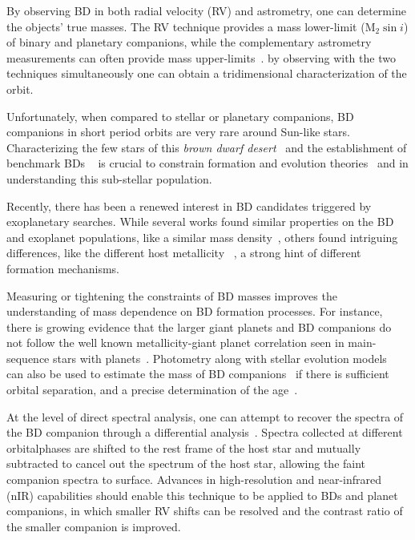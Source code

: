 \documentclass[fleqn,usenatbib]{mnras}
\newcommand*\bl{\color{blue}}
\begin{document}
    {\bl By observing BD in both radial velocity (RV) and astrometry, one can determine the objects' true masses}. The RV technique provides a mass lower-limit (\(\textrm{M}_{2}\sin{i}\)) of binary and planetary companions, while the complementary astrometry measurements can often provide mass upper-limits~\citep[e.g.][]{sahlmann_search_2011}. {\bl by observing with the two techniques simultaneously one can obtain a tridimensional characterization of the orbit.} 
    
    {\bl Unfortunately, when compared to stellar or planetary companions, BD companions in short period orbits are very rare around Sun-like stars. Characterizing the few stars of this \emph{brown dwarf desert}~\citep{halbwachs_exploring_2000,zucker_analysis_2001,sahlmann_search_2011} and the establishment of benchmark BDs ~\citep[e.g.][]{crepp_trends_2016} is crucial to constrain formation and evolution theories~\citep{whitworth_formation_2007} and in understanding this sub-stellar population.}
    
    Recently, there has been a renewed interest in BD candidates triggered by exoplanetary searches. {\bl While several works found similar properties on the BD and exoplanet populations, like a similar {\bl mass} density~\citep{hatzes_definition_2015}, others found intriguing differences, like the different host metallicity ~\citep{santos_observational_2017, schlaufman_evidence_2018}, a strong hint of different formation mechanisms.}
    
    Measuring or tightening the constraints of BD masses improves the understanding of mass dependence on BD formation processes. For instance, there is growing evidence that the larger giant planets and BD companions do not follow the well known metallicity-giant planet correlation seen in main-sequence stars with planets~\citep[e.g.][]{santos_spectroscopic_2004,santos_observational_2017, maldonado_searching_2017}. Photometry along with stellar evolution models~\citep[e.g.][]{baraffe_evolutionary_2003,allard_btsettl_2013} can also be used to estimate the mass of BD companions~\citep[e.g.][]{moutou_eccentricity_2017} if there is sufficient orbital separation, and a precise determination of the age~\citep[e.g.][]{soderblom_ages_2010}.
    
    {\bl At the level of direct spectral analysis, one can attempt to recover the spectra of the BD companion through a differential analysis~\citep{ferluga_separating_1997}. Spectra collected at different orbitalphases are shifted to the rest frame of the host star and mutually subtracted to cancel out the spectrum of the host star, allowing the faint companion spectra to surface.} Advances in high-resolution and near-infrared (nIR) capabilities should enable this technique to be applied to BDs and planet companions, in which smaller RV shifts can be resolved and the contrast ratio of the smaller companion is improved.
    
\end{document}
